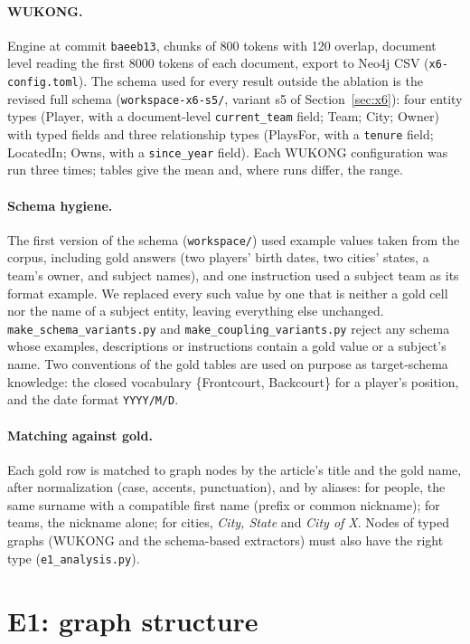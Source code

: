 \documentclass[11pt]{article}
\newcommand{\code}[1]{\texttt{#1}}
\newcommand{\wk}{WUKONG}
\begin{document}
\paragraph{\wk.} Engine at commit \code{baeeb13}, chunks of 800 tokens with 120 overlap, document
level reading the first 8000 tokens of each document, export to Neo4j CSV
(\code{x6-config.toml}). The schema used for every result outside the ablation is the revised
full schema (\code{workspace-x6-s5/}, variant s5 of Section~\ref{sec:x6}): four entity types
(Player, with a document-level \code{current\_team} field; Team; City; Owner) with typed fields and
three relationship types (PlaysFor, with a \code{tenure} field; LocatedIn; Owns, with a
\code{since\_year} field). Each \wk{} configuration
was run three times; tables give the mean and, where runs differ, the range.

\paragraph{Schema hygiene.} The first version of the schema (\code{workspace/}) used example values
taken from the corpus, including gold answers (two players' birth dates, two cities' states, a
team's owner, and subject names), and one instruction used a subject team as its format example.
We replaced every such value by one that is neither a gold cell nor the name of a subject entity,
leaving everything else unchanged. \code{make\_schema\_variants.py} and
\code{make\_coupling\_variants.py} reject any schema whose examples, descriptions or instructions
contain a gold value or a subject's name. Two conventions of the gold tables are used on purpose as
target-schema knowledge: the closed vocabulary \{Frontcourt, Backcourt\} for a player's position,
and the date format \code{YYYY/M/D}.

\paragraph{Matching against gold.} Each gold row is matched to graph nodes by the article's title
and the gold name, after normalization (case, accents, punctuation), and by aliases: for people,
the same surname with a compatible first name (prefix or common nickname); for teams, the nickname
alone; for cities, \emph{City, State} and \emph{City of X}. Nodes of typed graphs (\wk{} and the
schema-based extractors) must also have the right type (\code{e1\_analysis.py}).

\section{E1: graph structure}
\end{document}

